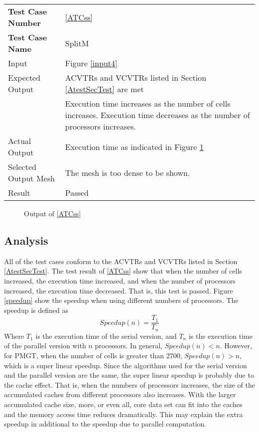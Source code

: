 \documentclass[12pt,titlepage]{article}
\begin{document}
\vspace{1cm}
\begin{minipage}{\textwidth}
\begin{tabular}{p{\colAwidth}|p{\colBwidth}} 
\hline \hline 
{\bf Test Case Number} & \cref{ATCss} \\ 
{\bf Test Case Name} & SplitM\\ 
\hline
Input & Figure \ref{input4}\\
Expected Output & ACVTRs and VCVTRs listed in Section \ref{AtestSecTest} are met\\
& Execution time increases as the number of cells increases. Execution time decreases as the number of processors increases.\\
Actual Output & Execution time as indicated in Figure \ref{output61}\\
Selected Output Mesh & The mesh is too dense to be shown.\\
Result & Passed\\
\hline \hline
\end{tabular}
\end{minipage}

\begin{figure}[ht]
\centering
{}
\caption{Output of \cref{ATCss}}
\label{output61}
\end{figure}

\subsection {Analysis \label{AtestSecAnalysis}}
All of the test cases conform to the ACVTRs and VCVTRs listed in Section \ref{AtestSecTest}. The test result of \cref{ATCss} show that when the number of cells increased, the execution time increased, and when the number of processors increased, the execution time decreased. That is, this test is passed. Figure \ref{speedup} show the speedup when using different numbers of processors. The speedup is defined as
\[ Speedup(n) = \frac{T_{1}}{T_{n}}
\]
Where $T_{1}$ is the execution time of the serial version, and $T_{n}$ is the execution time of the parallel version with $n$ processors. In general, $Speedup(n) < n$. However, for PMGT, when the number of cells is greater than 2700, $Speedup(n) > n$, which is a super linear speedup. Since the algorithms used for the serial version and the parallel version are the same, the super linear speedup is probably due to the cache effect. That is, when the numbers of processors increases, the size of the accumulated caches from different processors also increases. With the larger accumulated cache size, more, or even all, core data set can fit into the caches and the memory access time reduces dramatically. This may explain the extra speedup in additional to the speedup due to parallel computation.
\end{document}
